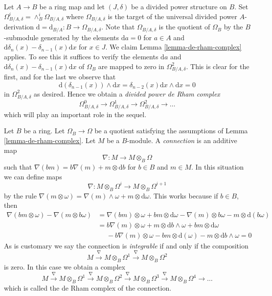 \begin{remark}
\label{remark-divided-powers-de-rham-complex}
Let $A \to B$ be a ring map and let $(J, \delta)$ be a divided power
structure on $B$. Set
$\Omega_{B/A, \delta}^i = \wedge^i_B \Omega_{B/A, \delta}$
where $\Omega_{B/A, \delta}$ is the target of the universal divided power
$A$-derivation $\text{d} = \text{d}_{B/A} : B \to \Omega_{B/A, \delta}$.
Note that $\Omega_{B/A, \delta}$ is the quotient of $\Omega_B$ by the
$B$-submodule generated by the elements
$\text{d}a = 0$ for $a \in A$ and
$\text{d}\delta_n(x) - \delta_{n - 1}(x)\text{d}x$ for $x \in J$.
We claim Lemma \ref{lemma-de-rham-complex} applies.
To see this it suffices to verify the elements
$\text{d}a$ and $\text{d}\delta_n(x) - \delta_{n - 1}(x)\text{d}x$
of $\Omega_B$ are mapped to zero in $\Omega^2_{B/A, \delta}$.
This is clear for the first, and for the last we observe that
$$
\text{d}(\delta_{n - 1}(x)) \wedge \text{d}x
= \delta_{n - 2}(x) \text{d}x \wedge \text{d}x = 0
$$
in $\Omega^2_{B/A, \delta}$ as desired. Hence we obtain a
{\it divided power de Rham complex}
$$
\Omega^0_{B/A, \delta} \to \Omega^1_{B/A, \delta} \to
\Omega^2_{B/A, \delta} \to \ldots
$$
which will play an important role in the sequel.
\end{remark}

\begin{remark}
\label{remark-connection}
Let $B$ be a ring. Let $\Omega_B \to \Omega$ be a quotient satisfying
the assumptions of Lemma \ref{lemma-de-rham-complex}.
Let $M$ be a $B$-module. A {\it connection} is an additive map
$$
\nabla : M \longrightarrow M \otimes_B \Omega
$$
such that $\nabla(bm) = b \nabla(m) + m \otimes \text{d}b$
for $b \in B$ and $m \in M$. In this situation we can define maps
$$
\nabla : M \otimes_B \Omega^i \longrightarrow M \otimes_B \Omega^{i + 1}
$$
by the rule $\nabla(m \otimes \omega) = \nabla(m) \wedge \omega +
m \otimes \text{d}\omega$. This works because if $b \in B$, then
\begin{align*}
\nabla(bm \otimes \omega) - \nabla(m \otimes b\omega)
& =
\nabla(bm) \otimes \omega + bm \otimes \text{d}\omega
- \nabla(m) \otimes b\omega - m \otimes \text{d}(b\omega) \\
& =
b\nabla(m) \otimes \omega + m \otimes \text{d}b \wedge \omega
+ bm \otimes \text{d}\omega \\
& \ \ \ \ \ \ - b\nabla(m) \otimes \omega - bm \otimes \text{d}(\omega)
- m \otimes \text{d}b \wedge \omega = 0
\end{align*}
As is customary we say the connection is {\it integrable} if and
only if the composition
$$
M \xrightarrow{\nabla} M \otimes_B \Omega^1
\xrightarrow{\nabla} M \otimes_B \Omega^2
$$
is zero. In this case we obtain a complex
$$
M \xrightarrow{\nabla} M \otimes_B \Omega^1
\xrightarrow{\nabla} M \otimes_B \Omega^2
\xrightarrow{\nabla} M \otimes_B \Omega^3
\xrightarrow{\nabla} M \otimes_B \Omega^4 \to \ldots
$$
which is called the de Rham complex of the connection.
\end{remark}

